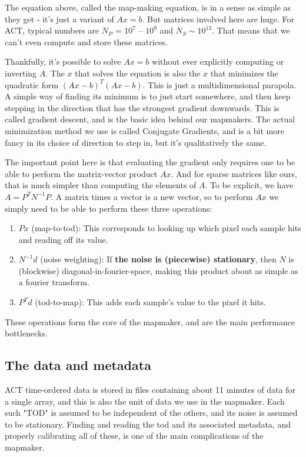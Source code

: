 \documentclass[a4paper, 11pt]{article}
\newcommand{\assume}[1]{{\bf#1}}
\begin{document}
The equation above, called the map-making equation, is in a sense as simple
as they get - it's just a variant of $Ax=b$. But matrices involved here are huge.
For ACT, typical numbers are $N_P$ = $10^7$ -- $10^9$ and $N_S \sim 10^{13}$.
That means that we can't even compute and store these matrices.

Thankfully, it's possible to solve $Ax=b$ without ever explicitly computing or
inverting $A$. The $x$ that solves the equation is also the $x$ that minimizes
the quadratic form $(Ax-b)^T(Ax-b)$. This is just a multidimensional parapola.
A simple way of finding its minimum is to just start somewhere, and then keep
stepping in the direction that has the strongest gradient downwards. This is
called gradient descent, and is the basic idea behind our mapmakers. The actual
minimization method we use is called Conjugate Gradients, and is a bit more
fancy in its choice of direction to step in, but it's qualitatively the same.

The important point here is that evaluating the gradient only requires one to
be able to perform the matrix-vector product $Ax$. And for sparse matrices like
ours, that is much simpler than computing the elements of $A$. To be explicit,
we have $A = P^TN^{-1}P$. A matrix times a vector is a new vector, so to
perform $Ax$ we simply need to be able to perform these three operations:
\begin{enumerate}
	\item $Px$ (map-to-tod): This corresponds to looking up which pixel each sample hits and reading off its value.
	\item $N^{-1}d$ (noise weighting): If \assume{the noise is (piecewise) stationary},
		then $N$ is (blockwise) diagonal-in-fourier-space, making this product
		about as simple as a fourier transform.
	\item $P^Td$ (tod-to-map): This adds each sample's value to the pixel it hits.
\end{enumerate}
These operations form the core of the mapmaker, and are the main performance bottlenecks.

\subsection{The data and metadata}
ACT time-ordered data is stored in files containing about 11 minutes of data for a single
array, and this is also the unit of data we use in the mapmaker. Each such "TOD" is assumed
to be independent of the others, and its noise is assumed to be stationary. Finding and
reading the tod and its associated metadata, and properly calibrating all of these, is one
of the main complications of the mapmaker.
\end{document}
